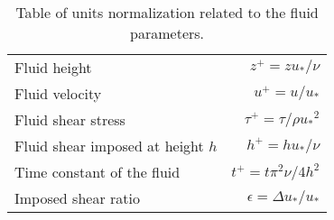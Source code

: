 \begin{table}
    \centering
    \begin{tabular}{l r}
        \hline
        Fluid height & $z^+ = zu_*/\nu$ \\
        Fluid velocity & $u^+ = u/u_*$ \\
        Fluid shear stress & $\tau^+ = \tau/\rho {u_*}^2$ \\
        Fluid shear imposed at height $h$ & $h^+ = hu_*/\nu$ \\
        Time constant of the fluid & $t^+ = t\pi^2\nu/4h^2$ \\
        Imposed shear ratio & $\epsilon = \Delta u_*/u_*$ \\
        \hline \hline
    \end{tabular}
    \caption{Table of units normalization related to the fluid parameters.}
    \label{tab:units}
\end{table}

